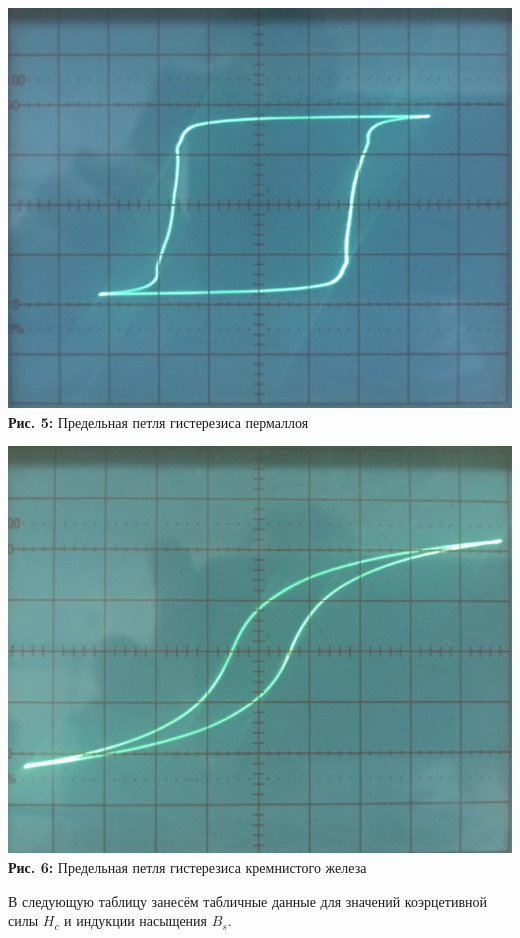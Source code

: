\documentclass[12pt,a4paper]{scrartcl}
\begin{document}
	\begin{center}
		\includegraphics[scale=0.628]{PIC_5.jpg}
		\\\textbf{Рис. 5: } Предельная петля гистерезиса пермаллоя
	\end{center}
	
		\begin{center}
		\includegraphics[scale=0.55]{PIC_6.jpg}
		\\\textbf{Рис. 6: } Предельная петля гистерезиса кремнистого железа
	\end{center}
	
В следующую таблицу занесём табличные данные для значений коэрцетивной силы $ H_c $ и индукции насыщения $ B_s $.
\end{document}
